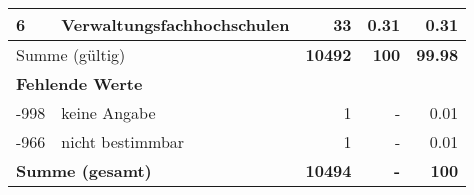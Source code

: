 \begin{longtable}{lXrrr}
     6 &
     \multicolumn{1}{X}{ Verwaltungsfachhochschulen   } &


       \num{33} &
       \num[round-mode=places,round-precision=2]{0,31} &
         \num[round-mode=places,round-precision=2]{0,31} \\
     \midrule
     \multicolumn{2}{l}{Summe (gültig)} &
       \textbf{\num{10492}} &
     \textbf{100} &
       \textbf{\num[round-mode=places,round-precision=2]{99,98}} \\
     \multicolumn{5}{l}{\textbf{Fehlende Werte}}\\
       -998 &
       keine Angabe &
         \num{1} &
        - &
         \num[round-mode=places,round-precision=2]{0,01} \\
       -966 &
       nicht bestimmbar &
         \num{1} &
        - &
         \num[round-mode=places,round-precision=2]{0,01} \\
     \midrule
     \multicolumn{2}{l}{\textbf{Summe (gesamt)}} &
          \textbf{\num{10494}} &
        \textbf{-} &
        \textbf{100} \\
     \bottomrule
     \end{longtable}
     
